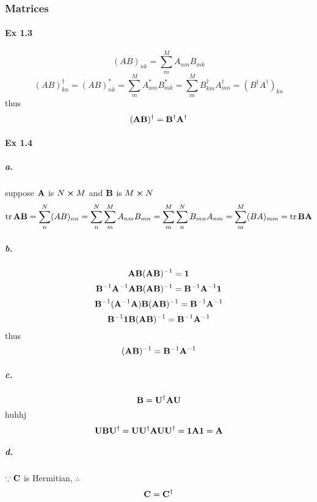 \documentclass[a4paper]{article}
\newcommand{\ex}[1]{\paragraph{Ex #1}}
\newcommand{\subex}[1]{\subparagraph{#1}}
\newcommand{\iden}{{\large \bm{1}}}
\numberwithin{equation}{subsection}
\begin{document}
\subsubsection{Matrices}
\ex{1.3}
\begin{equation}\label{key}
(AB)_{nk} = \sum_m^M A_{nm}B_{mk}
\end{equation}
\begin{equation}\label{key}
(AB)^\dagger_{kn} = (AB)_{nk}^* = \sum_m^M A_{nm}^*B_{mk}^* = \sum_m^M B^\dagger_{km} A^\dagger_{mn} = (B^\dagger A^\dagger)_{kn}
\end{equation}
thus
\begin{equation}\label{key}
(\vb{A}\vb{B})^\dagger = \vb{B}^\dagger \vb{A}^\dagger
\end{equation}

\ex{1.4}
\subex{a.}
suppose $ \vb{A} $ is $ N\cross M $ and $ \vb{B} $ is $ M\cross N $
\begin{equation}\label{key}
\tr \vb{A}\vb{B} = \sum_n^N (AB)_{nn} = \sum_n^N \sum_m^M A_{nm}B_{mn} = \sum_m^M\sum_n^N  B_{mn}A_{nm} = \sum_m^M (BA)_{mm} = \tr \vb{B}\vb{A}
\end{equation}
\subex{b.}
\begin{equation}\label{key}
\vb{AB}(\vb{AB})^{-1} = \iden
\end{equation}
\begin{equation}\label{key}
\vb{B}^{-1}\vb{A}^{-1}\vb{A}\vb{B}(\vb{AB})^{-1} = \vb{B}^{-1}\vb{A}^{-1}\iden
\end{equation}
\begin{equation}\label{key}
\vb{B}^{-1}(\vb{A}^{-1}\vb{A})\vb{B}(\vb{AB})^{-1} = \vb{B}^{-1}\vb{A}^{-1}
\end{equation}
\begin{equation}\label{key}
\vb{B}^{-1} \iden \vb{B}(\vb{AB})^{-1} = \vb{B}^{-1}\vb{A}^{-1}
\end{equation}
thus
\begin{equation}\label{key}
(\vb{AB})^{-1} = \vb{B}^{-1}\vb{A}^{-1}
\end{equation}
\subex{c.}
\begin{equation}\label{key}
\vb{B} = \vb{U}^\dagger \vb{A} \vb{U}
\end{equation}huhhj
\begin{equation}\label{key}
\vb{U} \vb{B} \vb{U}^\dagger = \vb{U} \vb{U}^\dagger \vb{A} \vb{U} \vb{U}^\dagger = \iden \vb{A} \iden = \vb{A}
\end{equation}
\subex{d.}
$ \because \vb{C}$ is Hermitian, $ \therefore $
\begin{equation}\label{key}
\vb{C} = \vb{C}^\dagger
\end{equation}
\end{document}
